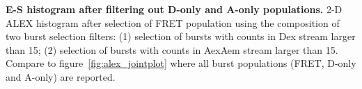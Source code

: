 \label{fig:alex_jointplot_fretsel} \textbf{E-S histogram after filtering out D-only and A-only populations.}
2-D ALEX histogram after selection of FRET population 
using the composition of two burst selection filters: 
(1) selection of bursts with counts in Dex stream larger than 15;
(2) selection of bursts with counts in AexAem stream larger than 15.
Compare to figure~\ref{fig:alex_jointplot} where all burst populations 
(FRET, D-only and A-only) are reported.
